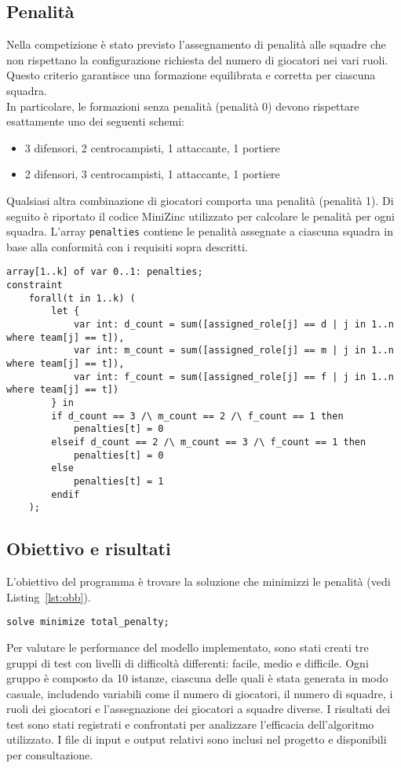 \documentclass{article}
\begin{document}
\begin{multicols*}{2}
\subsection{Penalità}
Nella competizione è stato previsto l'assegnamento di penalità alle squadre che non rispettano la configurazione richiesta del numero di giocatori nei vari ruoli. Questo criterio garantisce una formazione equilibrata e corretta per ciascuna squadra. 
\\
In particolare, le formazioni senza penalità (penalità 0) devono rispettare esattamente uno dei seguenti schemi:
\begin{itemize}
    \item 3 difensori, 2 centrocampisti, 1 attaccante, 1 portiere
    \item 2 difensori, 3 centrocampisti, 1 attaccante, 1 portiere
\end{itemize} 
Qualsiasi altra combinazione di giocatori comporta una penalità (penalità 1).
Di seguito è riportato il codice MiniZinc utilizzato per calcolare le penalità per ogni squadra. L'array \texttt{penalties} contiene le penalità assegnate a ciascuna squadra in base alla conformità con i requisiti sopra descritti.
\begin{lstlisting}[style=minizinc, caption={Penalità}, label={lst:penalita}]
array[1..k] of var 0..1: penalties;
constraint
    forall(t in 1..k) (
        let {
            var int: d_count = sum([assigned_role[j] == d | j in 1..n where team[j] == t]),
            var int: m_count = sum([assigned_role[j] == m | j in 1..n where team[j] == t]),
            var int: f_count = sum([assigned_role[j] == f | j in 1..n where team[j] == t])
        } in
        if d_count == 3 /\ m_count == 2 /\ f_count == 1 then
            penalties[t] = 0
        elseif d_count == 2 /\ m_count == 3 /\ f_count == 1 then
            penalties[t] = 0
        else
            penalties[t] = 1
        endif
    );
\end{lstlisting}

\subsection{Obiettivo e risultati}

L'obiettivo del programma è trovare la soluzione che minimizzi le penalità (vedi Listing~\ref{lst:obb}).

\begin{lstlisting}[style=minizinc, caption={Obiettivo del problema}, label={lst:obb}]
solve minimize total_penalty;
\end{lstlisting}
Per valutare le performance del modello implementato, 
sono stati creati tre gruppi di test con livelli di difficoltà differenti: facile, medio e difficile. 
Ogni gruppo è composto da 10 istanze, ciascuna delle quali è stata generata in modo casuale, includendo variabili come il numero di giocatori, il numero di squadre, i ruoli dei giocatori e l'assegnazione dei giocatori a squadre diverse.
I risultati dei test sono stati registrati e confrontati per analizzare l'efficacia dell'algoritmo utilizzato. 
I file di input e output relativi sono inclusi nel progetto e disponibili per consultazione.


\end{multicols*}
\end{document}

